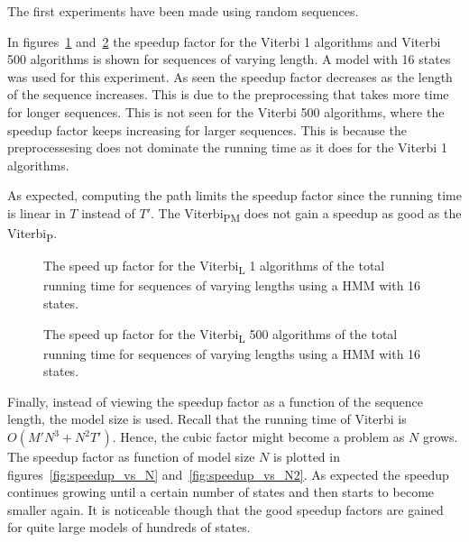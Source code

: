 The first experiments have been made using random sequences.

In figures~\ref{fig:compressed_1_speedup_vs_sequence_length}
and~\ref{fig:compressed_500_speedup_vs_sequence_length} the speedup factor for
the Viterbi 1 algorithms and Viterbi 500 algorithms is shown for sequences of
varying length. A model with 16 states was used for this experiment. As seen
the speedup factor decreases as the length of the sequence increases. This is
due to the preprocessing that takes more time for longer
sequences.   This
is not seen for the Viterbi 500 algorithms, where the speedup factor keeps
increasing for larger sequences. This is because the preprocessesing does not
dominate the running time as it does for the Viterbi 1 algorithms.

As expected, computing the path limits the speedup factor since the running
time is linear in $T$ instead of $T'$. The Viterbi\textsubscript{PM} does not
gain a speedup as good as the Viterbi\textsubscript{P}. 

\begin{figure}
  \centering
  
  \caption{The speed up factor for the Viterbi\textsubscript{L} 1 algorithms of the total
    running time for sequences of varying lengths using
    a HMM with 16 states.}
  \label{fig:compressed_1_speedup_vs_sequence_length}
\end{figure}

\begin{figure}
  \centering
  
  \caption{The speed up factor for the Viterbi\textsubscript{L} 500 algorithms of the total
    running time for sequences of varying lengths using
    a HMM with 16 states.}
  \label{fig:compressed_500_speedup_vs_sequence_length}
\end{figure}

Finally, instead of viewing the speedup factor as a function of the sequence
length, the model size is used. Recall that the running time of Viterbi is
$O(M' N^3 + N^2 T')$. Hence, the cubic factor might become a problem as $N$
grows. The speedup factor as function of model size $N$ is plotted in
figures~\ref{fig:speedup_vs_N} and~\ref{fig:speedup_vs_N2}. As expected the
speedup continues growing until a certain number of states and then starts to
become smaller again. It is noticeable though that the good speedup factors are
gained for quite large models of hundreds of states.

